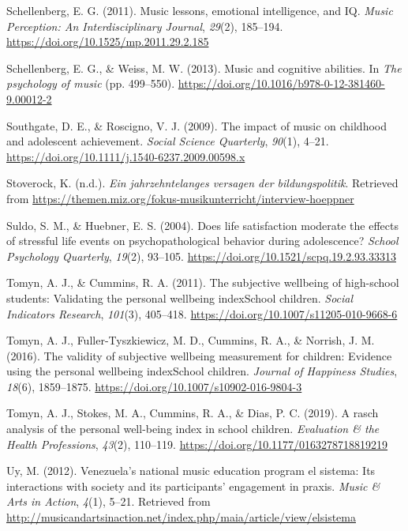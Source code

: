 \documentclass[a4, 12pt]{article}
\begin{document}
\leavevmode\hypertarget{ref-Schellenberg2011a}{}%
Schellenberg, E. G. (2011). Music lessons, emotional intelligence, and IQ. \emph{Music Perception: An Interdisciplinary Journal}, \emph{29}(2), 185--194. \url{https://doi.org/10.1525/mp.2011.29.2.185}

\leavevmode\hypertarget{ref-Schellenberg2013}{}%
Schellenberg, E. G., \& Weiss, M. W. (2013). Music and cognitive abilities. In \emph{The psychology of music} (pp. 499--550). \url{https://doi.org/10.1016/b978-0-12-381460-9.00012-2}

\leavevmode\hypertarget{ref-Southgate2009}{}%
Southgate, D. E., \& Roscigno, V. J. (2009). The impact of music on childhood and adolescent achievement. \emph{Social Science Quarterly}, \emph{90}(1), 4--21. \url{https://doi.org/10.1111/j.1540-6237.2009.00598.x}

\leavevmode\hypertarget{ref-Stoverock}{}%
Stoverock, K. (n.d.). \emph{Ein jahrzehntelanges versagen der bildungspolitik}. Retrieved from \url{https://themen.miz.org/fokus-musikunterricht/interview-hoeppner}

\leavevmode\hypertarget{ref-Suldo2004}{}%
Suldo, S. M., \& Huebner, E. S. (2004). Does life satisfaction moderate the effects of stressful life events on psychopathological behavior during adolescence? \emph{School Psychology Quarterly}, \emph{19}(2), 93--105. \url{https://doi.org/10.1521/scpq.19.2.93.33313}

\leavevmode\hypertarget{ref-Tomyn2011a}{}%
Tomyn, A. J., \& Cummins, R. A. (2011). The subjective wellbeing of high-school students: Validating the personal wellbeing indexSchool children. \emph{Social Indicators Research}, \emph{101}(3), 405--418. \url{https://doi.org/10.1007/s11205-010-9668-6}

\leavevmode\hypertarget{ref-Tomyn2016}{}%
Tomyn, A. J., Fuller-Tyszkiewicz, M. D., Cummins, R. A., \& Norrish, J. M. (2016). The validity of subjective wellbeing measurement for children: Evidence using the personal wellbeing indexSchool children. \emph{Journal of Happiness Studies}, \emph{18}(6), 1859--1875. \url{https://doi.org/10.1007/s10902-016-9804-3}

\leavevmode\hypertarget{ref-Tomyn2019}{}%
Tomyn, A. J., Stokes, M. A., Cummins, R. A., \& Dias, P. C. (2019). A rasch analysis of the personal well-being index in school children. \emph{Evaluation \& the Health Professions}, \emph{43}(2), 110--119. \url{https://doi.org/10.1177/0163278718819219}

\leavevmode\hypertarget{ref-Uy2012}{}%
Uy, M. (2012). Venezuela's national music education program el sistema: Its interactions with society and its participants' engagement in praxis. \emph{Music \& Arts in Action}, \emph{4}(1), 5--21. Retrieved from \url{http://musicandartsinaction.net/index.php/maia/article/view/elsistema}
\end{document}
